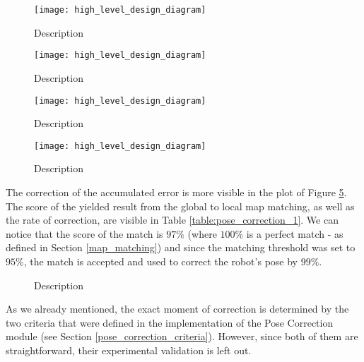 \begin{figure}
    \centering
    \texttt{[image: high\_level\_design\_diagram]}
    \caption[Name]{
        Description
    }
    \label{fig:terrain_3}
\end{figure}

\begin{figure}
    \centering
    \texttt{[image: high\_level\_design\_diagram]}
    \caption[Name]{
        Description
    }
    \label{fig:bird_3}
\end{figure}

\begin{figure}
    \centering
    \texttt{[image: high\_level\_design\_diagram]}
    \caption[Name]{
        Description
    }
    \label{fig:global_elevation_map_1}
\end{figure}

\begin{figure}
    \centering
    \texttt{[image: high\_level\_design\_diagram]}
    \caption[Name]{
        Description
    }
    \label{fig:global_gradient_map_1}
\end{figure}


The correction of the accumulated error is more visible in the plot of
Figure \ref{fig:pose_correction_error_1}.
The score of the yielded result from the global to local map matching,
as well as the rate of correction, are visible in Table
\ref{table:pose_correction_1}.
We can notice that the score of the match is $97\%$ (where $100\%$ is a
perfect match - as defined in Section \ref{map_matching}) and since
the matching threshold was set to $95\%$, the match is accepted and used
to correct the robot's pose by $99\%$.

\begin{figure}
    \centering
    
    \caption[Name]{
        Description
    }
    \label{fig:pose_correction_error_1}
\end{figure}

As we already mentioned, the exact moment of correction is determined by
the two criteria that were defined in the implementation of the Pose Correction
module (see Section \ref{pose_correction_criteria}).
However, since both of them are straightforward, their experimental
validation is left out.

